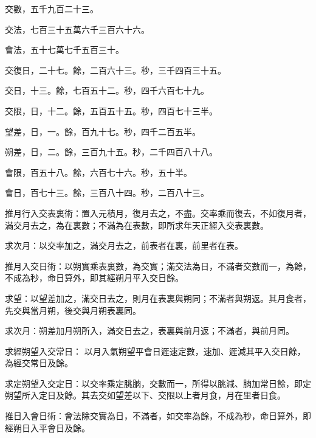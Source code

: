 \begin{pinyinscope}
 交數，五千九百二十三。



 交法，七百三十五萬六千三百六十六。



 會法，五十七萬七千五百三十。



 交復日，二十七。餘，二百六十三。秒，三千四百三十五。



 交日，十三。餘，七百五十二。秒，四千六百七十九。



 交限，日，十二。餘，五百五十五。秒，四百七十三半。



 望差，日，一。餘，百九十七。秒，四千二百五半。



 朔差，日，二。餘，三百九十五。秒，二千四百八十八。



 會限，百五十八。餘，六百七十六。秒，五十半。



 會日，百七十三。餘，三百八十四。秒，二百八十三。



 推月行入交表裏術：置入元積月，復月去之，不盡。交率乘而復去，不如復月者，滿交月去之，為在裏數；不滿為在表數，即所求年天正經入交表裏數。



 求次月：以交率加之，滿交月去之，前表者在裏，前里者在表。



 推月入交日術：以朔實乘表裏數，為交實；滿交法為日，不滿者交數而一，為餘，不成為秒，命日算外，即其經朔月平入交日餘。



 求望：以望差加之，滿交日去之，則月在表裏與朔同；不滿者與朔返。其月食者，先交與當月朔，後交與月朔表裏同。



 求次月：朔差加月朔所入，滿交日去之，表裏與前月返；不滿者，與前月同。



 求經朔望入交常日：
 以月入氣朔望平會日遲速定數，速加、遲減其平入交日餘，為經交常日及餘。



 求定朔望入交定日：以交率乘定朓朒，交數而一，所得以朓減、朒加常日餘，即定朔望所入定日及餘。其去交如望差以下、交限以上者月食，月在里者日食。



 推日入會日術：會法除交實為日，不滿者，如交率為餘，不成為秒，命日算外，即經朔日入平會日及餘。




\end{pinyinscope}
